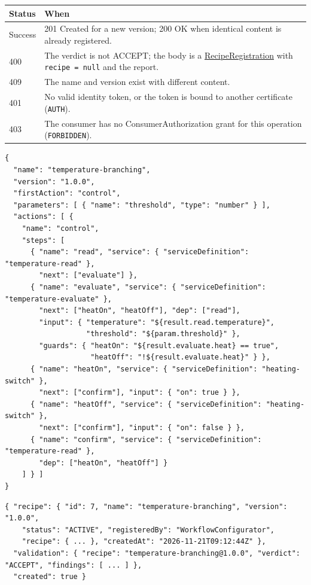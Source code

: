 \documentclass[a4paper]{arrowhead}
\newcommand{\mref}[1]{{\textcolor{ArrowheadPurple}{\hyperref[sec:model:#1]{#1}}}}
\begin{document}
{\small
\begin{longtable}{|p{2.0cm}|p{13.8cm}|}

\hline
\rowcolor{gray!33} Status & When \\ \hline
\endhead
Success & 201 Created for a new version; 200 OK when identical content is already registered. \\ \hline
400 & The verdict is not ACCEPT; the body is a \mref{RecipeRegistration} with \texttt{recipe = null} and the report. \\ \hline
409 & The name and version exist with different content. \\ \hline
401 & No valid identity token, or the token is bound to another certificate (\texttt{AUTH}). \\ \hline
403 & The consumer has no ConsumerAuthorization grant for this operation (\texttt{FORBIDDEN}). \\ \hline
\end{longtable}
}


\begin{lstlisting}[caption={Example request body}]
{
  "name": "temperature-branching",
  "version": "1.0.0",
  "firstAction": "control",
  "parameters": [ { "name": "threshold", "type": "number" } ],
  "actions": [ {
    "name": "control",
    "steps": [
      { "name": "read", "service": { "serviceDefinition": "temperature-read" },
        "next": ["evaluate"] },
      { "name": "evaluate", "service": { "serviceDefinition": "temperature-evaluate" },
        "next": ["heatOn", "heatOff"], "dep": ["read"],
        "input": { "temperature": "${result.read.temperature}",
                   "threshold": "${param.threshold}" },
        "guards": { "heatOn": "${result.evaluate.heat} == true",
                    "heatOff": "!${result.evaluate.heat}" } },
      { "name": "heatOn", "service": { "serviceDefinition": "heating-switch" },
        "next": ["confirm"], "input": { "on": true } },
      { "name": "heatOff", "service": { "serviceDefinition": "heating-switch" },
        "next": ["confirm"], "input": { "on": false } },
      { "name": "confirm", "service": { "serviceDefinition": "temperature-read" },
        "dep": ["heatOn", "heatOff"] }
    ] } ]
}
\end{lstlisting}


\begin{lstlisting}[caption={Example response body}]
{ "recipe": { "id": 7, "name": "temperature-branching", "version": "1.0.0",
    "status": "ACTIVE", "registeredBy": "WorkflowConfigurator",
    "recipe": { ... }, "createdAt": "2026-11-21T09:12:44Z" },
  "validation": { "recipe": "temperature-branching@1.0.0", "verdict": "ACCEPT", "findings": [ ... ] },
  "created": true }
\end{lstlisting}
\end{document}
